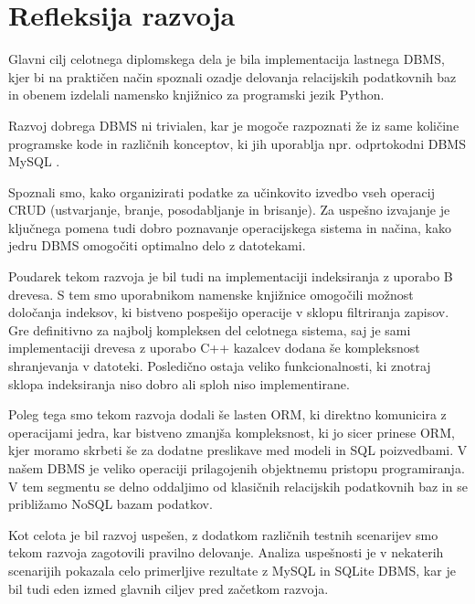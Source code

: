 \documentclass[a4paper,12pt,openright]{book}
\begin{document}
    \section{Refleksija razvoja}
    \label{refleksija}

    Glavni cilj celotnega diplomskega dela je bila implementacija lastnega DBMS, kjer bi na praktičen način spoznali ozadje delovanja relacijskih podatkovnih baz in obenem izdelali namensko knjižnico za programski jezik Python.

    Razvoj dobrega DBMS ni trivialen, kar je mogoče razpoznati že iz same količine programske kode in različnih konceptov, ki jih uporablja npr. odprtokodni DBMS MySQL \cite{MYSQL_GITHUB}.
    
    Spoznali smo, kako organizirati podatke za učinkovito izvedbo vseh operacij CRUD (ustvarjanje, branje, posodabljanje in brisanje). Za uspešno izvajanje je ključnega pomena tudi dobro poznavanje operacijskega sistema in načina, kako jedru DBMS omogočiti optimalno delo z datotekami.
    
     Poudarek tekom razvoja je bil tudi na implementaciji indeksiranja z uporabo B drevesa. S tem smo uporabnikom namenske knjižnice omogočili možnost določanja indeksov, ki bistveno pospešijo operacije v sklopu filtriranja zapisov. Gre definitivno za najbolj kompleksen del celotnega sistema, saj je sami implementaciji drevesa z uporabo C++ kazalcev dodana še kompleksnost shranjevanja v datoteki. Posledično ostaja veliko funkcionalnosti, ki znotraj sklopa indeksiranja niso dobro ali sploh niso implementirane.
    
    Poleg tega smo tekom razvoja dodali še lasten ORM, ki direktno komunicira z operacijami jedra, kar bistveno zmanjša kompleksnost, ki jo sicer prinese ORM, kjer moramo skrbeti še za dodatne preslikave med modeli in SQL poizvedbami. V našem DBMS je veliko operaciji prilagojenih objektnemu pristopu programiranja. V tem segmentu se delno oddaljimo od klasičnih relacijskih podatkovnih baz in se približamo NoSQL bazam podatkov.
    
    Kot celota je bil razvoj uspešen, z dodatkom različnih testnih scenarijev smo tekom razvoja zagotovili pravilno delovanje. Analiza uspešnosti je v nekaterih scenarijih pokazala celo primerljive rezultate z MySQL in SQLite DBMS, kar je bil tudi eden izmed glavnih ciljev pred začetkom razvoja.


\raggedright

\printbibliography[heading=bibintoc,title={Literatura}]
\end{document}
